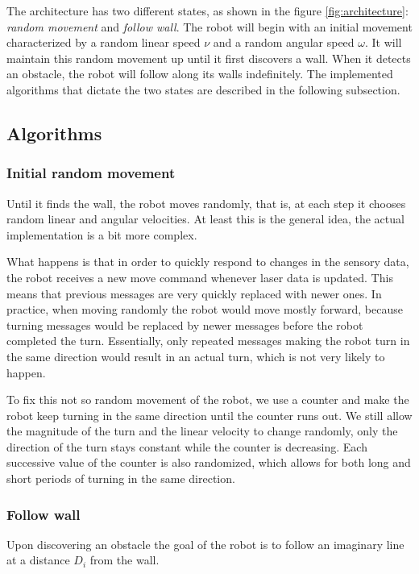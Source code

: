 \documentclass[10pt,journal,compsoc]{IEEEtran}
\begin{document}
The architecture has two different states, as shown in the figure \ref{fig:architecture}: \textit{random movement} and \textit{follow wall}. The robot will begin with an initial movement characterized by a random linear speed $\nu$ and a random angular speed $\omega$. It will maintain this random movement up until it first discovers a wall. When it detects an obstacle, the robot will follow along its walls indefinitely. The implemented algorithms that dictate the two states are described in the following subsection. 

\subsection{Algorithms}
\subsubsection{Initial random movement}\label{subsec:initial}

Until it finds the wall, the robot moves randomly, that is, at each step it chooses random linear and angular velocities. At least this is the general idea, the actual implementation is a bit more complex. 

What happens is that in order to quickly respond to changes in the sensory data, the robot receives a new move command whenever laser data is updated. This means that previous messages are very quickly replaced with newer ones. In practice, when moving randomly the robot would move mostly forward, because turning messages would be replaced by newer messages before the robot completed the turn. Essentially, only repeated messages making the robot turn in the same direction would result in an actual turn, which is not very likely to happen.

To fix this not so random movement of the robot, we use a counter and make the robot keep turning in the same direction until the counter runs out. We still allow the magnitude of the turn and the linear velocity to change randomly, only the direction of the turn stays constant while the counter is decreasing. Each successive value of the counter is also randomized, which allows for both long and short periods of turning in the same direction.

\subsubsection{Follow wall}
Upon discovering an obstacle the goal of the robot is to follow an imaginary line at a distance $D_i$ from the wall. 
\end{document}
